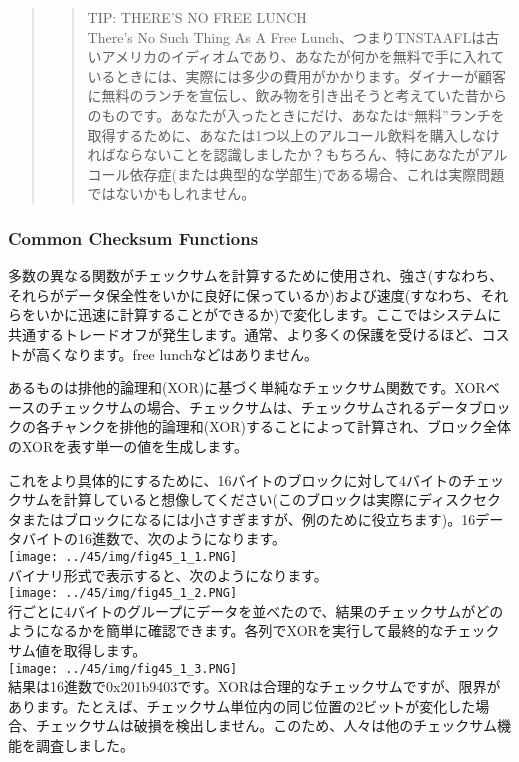 \begin{quote}
\begin{quote}
TIP: THERE'S NO FREE LUNCH\\
There's No Such Thing As A Free
Lunch、つまりTNSTAAFLは古いアメリカのイディオムであり、あなたが何かを無料で手に入れているときには、実際には多少の費用がかかります。ダイナーが顧客に無料のランチを宣伝し、飲み物を引き出そうと考えていた昔からのものです。あなたが入ったときにだけ、あなたは``無料''ランチを取得するために、あなたは1つ以上のアルコール飲料を購入しなければならないことを認識しましたか？もちろん、特にあなたがアルコール依存症(または典型的な学部生)である場合、これは実際問題ではないかもしれません。
\end{quote}
\end{quote}

\hypertarget{common-checksum-functions}{%
\subsubsection*{Common Checksum
Functions}\label{common-checksum-functions}}

多数の異なる関数がチェックサムを計算するために使用され、強さ(すなわち、それらがデータ保全性をいかに良好に保っているか)および速度(すなわち、それらをいかに迅速に計算することができるか)で変化します。ここではシステムに共通するトレードオフが発生します。通常、より多くの保護を受けるほど、コストが高くなります。free
lunchなどはありません。

あるものは排他的論理和(XOR)に基づく単純なチェックサム関数です。XORベースのチェックサムの場合、チェックサムは、チェックサムされるデータブロックの各チャンクを排他的論理和(XOR)することによって計算され、ブロック全体のXORを表す単一の値を生成します。

これをより具体的にするために、16バイトのブロックに対して4バイトのチェックサムを計算していると想像してください(このブロックは実際にディスクセクタまたはブロックになるには小さすぎますが、例のために役立ちます)。16データバイトの16進数で、次のようになります。\\
\texttt{[image: ../45/img/fig45\_1\_1.PNG]}\\
バイナリ形式で表示すると、次のようになります。\\
\texttt{[image: ../45/img/fig45\_1\_2.PNG]}\\
行ごとに4バイトのグループにデータを並べたので、結果のチェックサムがどのようになるかを簡単に確認できます。各列でXORを実行して最終的なチェックサム値を取得します。\\
\texttt{[image: ../45/img/fig45\_1\_3.PNG]}\\
結果は16進数で0x201b9403です。XORは合理的なチェックサムですが、限界があります。たとえば、チェックサム単位内の同じ位置の2ビットが変化した場合、チェックサムは破損を検出しません。このため、人々は他のチェックサム機能を調査しました。

